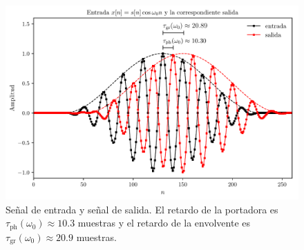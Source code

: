 \documentclass[a4paper]{report}
\begin{document}
\begin{enumerate}
\begin{figure}[!htb]
 \begin{center}
 \includegraphics[width=\textwidth]{figuras/transform_analysis_group_delay_input_output.pdf}
 \caption{\label{fig:transform_analysis_group_delay_input_output} Señal de entrada y señal de salida. El retardo de la portadora es \(\tau_\textrm{ph}(\omega_0)\approx10.3\) muestras y el retardo de la envolvente es \(\tau_\textrm{gr}(\omega_0)\approx20.9\) muestras.}
 \end{center}
\end{figure} 
\end{enumerate}
\end{document}
